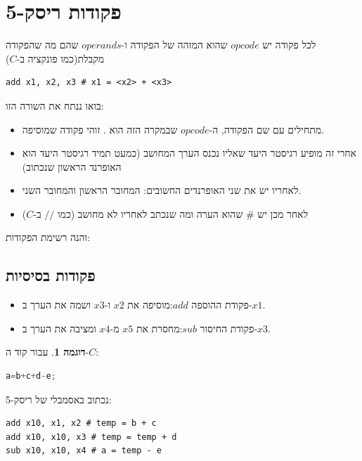 \documentclass[12pt]{article}
\theoremstyle{plain}
\theoremstyle{definition}
\newtheorem{example}[theorem]{דוגמה}      %
\theoremstyle{remark}
\begin{document}
\section{פקודות ריסק-5}
לכל פקודה יש \({opcode}\) שהוא המזהה של הפקודה ו-\({operands}\) שהם מה שהפקודה מקבלת(כמו פונקציה ב-\({C}\))\begin{LTR}\begin{lstlisting}[language=riscv]
add x1, x2, x3 # x1 = <x2> + <x3>

\end{lstlisting}\end{LTR}בואו ננתח את השורה הזו:\begin{itemize}
\item מתחילים עם שם הפקודה, ה-\({opcode}\) שבמקרה הזה הוא . זוהי פקודה שמוסיפה.
\item אחרי זה מופיע רגיסטר היעד שאליו נכנס הערך המחושב (כמעט תמיד רגיסטר היעד הוא האופרנד הראשון שנכתוב)
\item לאחריו יש את שני האופרנדים החשובים: המחובר הראשון והמחובר השני.
\item לאחר מכן יש \({\#}\) שהוא הערה ומה שנכתב לאחריו לא מחושב (כמו \({//}\) ב-\({C}\))
\end{itemize}
והנה רשימת הפקודות:\subsection{פקודות בסיסיות}
\begin{itemize}
\item פקודת ההוספה \({add}\):מוסיפה את \({x2}\) ו-\({x3}\) ושמה את הערך ב-\({x1}\).
\item פקודת החיסור \({sub}\):מחסרת את \({x5}\) מ-\({x4}\) ומציבה את הערך ב-\({x3}\).
\end{itemize}
\begin{example}
עבור קוד ה-\({C}\):\begin{LTR}\begin{lstlisting}[language=c]
a=b+c+d-e;

\end{lstlisting}\end{LTR}נכתוב באסמבלי של ריסק-5:\begin{LTR}\begin{lstlisting}[language=riscv]
add x10, x1, x2 # temp = b + c
add x10, x10, x3 # temp = temp + d
sub x10, x10, x4 # a = temp - e

\end{lstlisting}\end{LTR}
\end{example}
\end{document}
